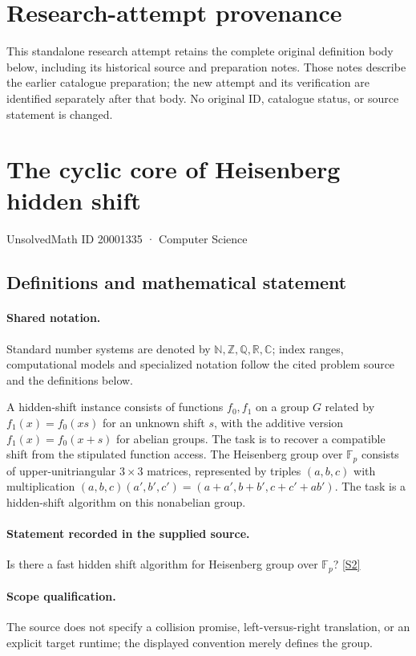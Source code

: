 \documentclass[11pt]{article}
\begin{document}
\section*{Research-attempt provenance}
This standalone research attempt retains the complete original definition body below,
including its historical source and preparation notes. Those notes describe the
earlier catalogue preparation; the new attempt and its verification are identified
separately after that body. No original ID, catalogue status, or source statement is changed.

\section{The cyclic core of Heisenberg hidden shift}\label{20001335}
{\small UnsolvedMath ID 20001335 · Computer Science}
\subsection{Definitions and mathematical statement}

\paragraph{Shared notation.}Standard number systems are denoted by $\mathbb N,\mathbb Z,\mathbb Q,\mathbb R,\mathbb C$; index ranges, computational models and specialized notation follow the cited problem source and the definitions below.


A hidden-shift instance consists of functions $f_0,f_1$ on a group $G$ related by $f_1(x)=f_0(xs)$ for an unknown shift $s$, with the additive version $f_1(x)=f_0(x+s)$ for abelian groups. The task is to recover a compatible shift from the stipulated function access. The Heisenberg group over $\mathbb F_p$ consists of upper-unitriangular $3\times3$ matrices, represented by triples $(a,b,c)$ with multiplication $(a,b,c)(a',b',c')=(a+a',b+b',c+c'+ab')$. The task is a hidden-shift algorithm on this nonabelian group.
\paragraph{Statement recorded in the supplied source.}
Is there a fast hidden shift algorithm for Heisenberg group over $\mathbb F_p$? \href{http://aimpl.org/quantumalg/4/}{[S2]}
\paragraph{Scope qualification.}
The source does not specify a collision promise, left-versus-right translation, or an explicit target runtime; the displayed convention merely defines the group.
\end{document}
